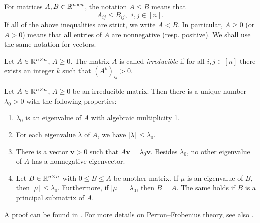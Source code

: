 For matrices $A, B \in \mathbb{R}^{n \times n}$, the notation $A \le B$ means that 
\begin{equation*}
    A_{ij} \le B_{ij}, \ \ i, j \in [n].
\end{equation*}
If all of the above inequalities are strict, we write $A < B$. 
In particular, $A \ge 0$ (or $A > 0$) means that all entries of $A$ are nonnegative (resp. positive).
We shall use the same notation for vectors.

\begin{definition}
    Let $A \in \mathbb{R}^{n \times n}$, $A \ge 0$.
    The matrix $A$ is called \textit{irreducible} if for all $i,j \in [n]$ there exists an integer $k$ such that $(A^k)_{ij} > 0$.
\end{definition}

\begin{theorem} \label{thm:perron-frobenius}
    Let $A \in \mathbb{R}^{n \times n}$, $A \ge 0$ be an irreducible matrix. 
    Then there is a unique number $\lambda_0 > 0$ with the following properties:
    \begin{enumerate}
        \item $\lambda_0$ is an eigenvalue of $A$ with algebraic multiplicity 1.
        \item For each eigenvalue $\lambda$ of $A$, we have $|\lambda|\, \le \lambda_0$. 
        \item There is a vector $\bm{v} > 0$ such that $A \bm{v} = \lambda_0 \bm{v}$.
            Besides $\lambda_0$, no other eigenvalue of $A$ has a nonnegative eigenvector.  
        \item Let $B \in \mathbb{R}^{n \times n}$ with $0 \le B \le A$ be another matrix. 
            If $\mu$ is an eigenvalue of $B$, then $|\mu|\, \le \lambda_0$. 
            Furthermore, if $|\mu|\, = \lambda_0$, then $B = A$.
            The same holds if $B$ is a principal submatrix of $A$.
    \end{enumerate}
\end{theorem}
A proof can be found in \cite[Theorem 2.2.1]{brouwerhaemers}.
For more details on Perron--Frobenius theory, see also \cite[Chapter XIII]{gantmacher}.

